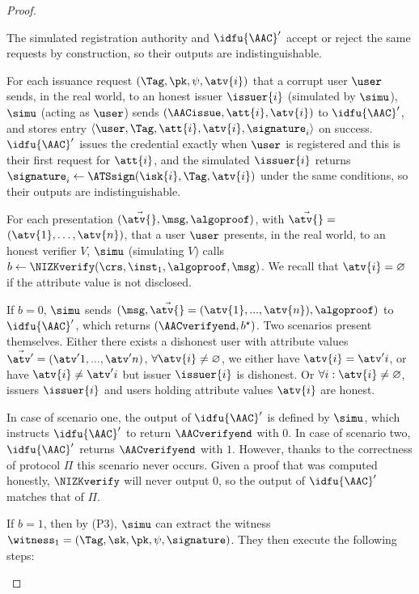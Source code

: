 \begin{proof}
\begin{description}
      The simulated registration authority and $\idfu{\AAC}'$ accept or reject
the same requests by construction, so their outputs are indistinguishable.

    \item[Issue.] For each issuance request $(\Tag, \pk, \psi, \atv{i})$ that a
corrupt user $\user$ sends, in the real world, to an honest issuer $\issuer{i}$
(simulated by $\simu$), $\simu$ (acting as $\user$) sends $(\AACissue, \att{i},
\atv{i})$ to $\idfu{\AAC}'$, and stores entry $\langle \user, \Tag, \att{i},
\atv{i}, \signature_i\rangle$ on success.  $\idfu{\AAC}'$ issues the credential
exactly when $\user$ is registered and this is their first request for
$\att{i}$,
and the simulated $\issuer{i}$ returns $\signature_i \leftarrow
\ATSsign(\isk{i}, \Tag, \atv{i})$ under the same conditions, so their outputs
are indistinguishable.

    \item[Verify.] For each presentation $(\vec{\atv{}}, \msg, \algoproof)$, with $\vec{\atv{}} =$
$(\atv{1}, \ldots, \atv{n})$, that a user $\user$ presents, in the real world, to an honest
verifier $V$, $\simu$ (simulating $V$) calls $b \leftarrow \NIZKverify(\crs,
\inst_1, \algoproof, \msg)$.  We recall that $\atv{i} = \varnothing$ if the
attribute value is not disclosed.

      If $b  = 0$,  $\simu$ sends $(\msg, \vec{\atv{}} = (\atv{1}, ...,
\atv{n}), \algoproof)$ to $\idfu{\AAC}'$, which returns $(\AACverifyend,
b^\star)$.  Two scenarios present themselves. Either there exists a dishonest
user with attribute values $\vec{\atv'{}} = (\atv'{1}, ..., \atv'{n})$, $\forall
\atv{i} \neq \varnothing$, we either have $\atv{i} = \atv'{i}$, or have $\atv{i}
\neq \atv'{i}$ but issuer $\issuer{i}$ is dishonest.  Or $\forall i: \atv{i} \neq
\varnothing$, issuers $\issuer{i}$ and users holding attribute values $\atv{i}$
are honest.

      In case of scenario one, the output of $\idfu{\AAC}'$ is defined by
$\simu$, which instructs $\idfu{\AAC}'$ to return $\AACverifyend$ with $0$.  In case
of scenario two, $\idfu{\AAC}'$ returns $\AACverifyend$ with $1$.  However, thanks
to the correctness of protocol $\Pi$ this scenario never occurs.  Given a proof
that was computed honestly,  $\NIZKverify$ will never output $0$, so the output
of $\idfu{\AAC}'$ matches that of $\Pi$.

      If $b = 1$, then by (P3), $\simu$ can extract the witness $\witness_1 =
(\Tag, \sk, \pk, \psi, \signature)$. They then execute the following steps:


\end{description}
\end{proof}
